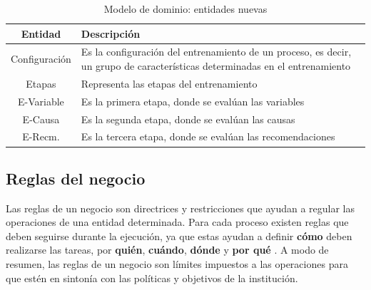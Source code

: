 \begin{table}[H]
\begin{center}
\begin{tabular}{ | c | p{12cm} | }
\hline
\textbf{Entidad} & \textbf{Descripción} \\
\hline
Configuración & Es la configuración del entrenamiento de un proceso, es decir, un grupo de características determinadas en el entrenamiento \\
\hline
Etapas & Representa las etapas del entrenamiento \\
\hline
E-Variable & Es la primera etapa, donde se evalúan las variables \\
\hline
E-Causa & Es la segunda etapa, donde se evalúan las causas \\
\hline
E-Recm. & Es la tercera etapa, donde se evalúan las recomendaciones \\
\hline
\end{tabular}
\caption{Modelo de dominio: entidades nuevas}
\label{tab:ent-verde}
\end{center}
\end{table}

\subsection{Reglas del negocio}
Las reglas de un negocio son directrices y restricciones que ayudan a regular las operaciones de una entidad determinada. Para cada proceso existen reglas que deben seguirse durante la ejecución, ya que estas ayudan a definir \textbf{cómo} deben realizarse las tareas, por \textbf{quién}, \textbf{cuándo}, \textbf{dónde} y \textbf{por qué} \cite{Chisholm2007}. A modo de resumen, las reglas de un negocio son límites impuestos a las operaciones para que estén en sintonía con las políticas y objetivos de la institución.

